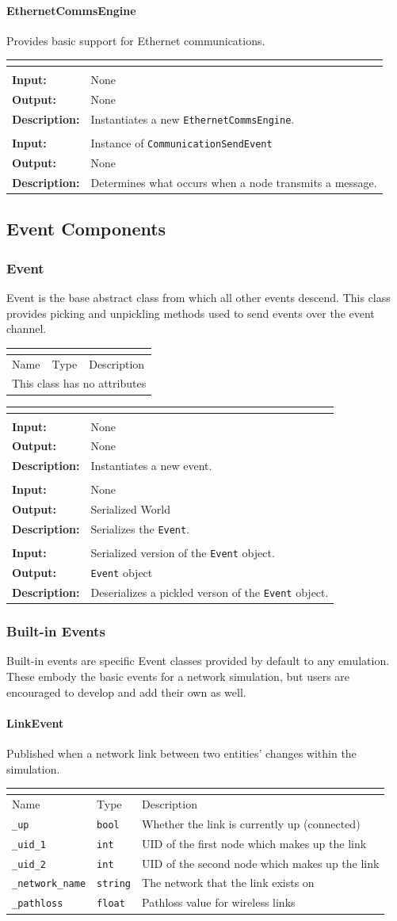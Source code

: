 \documentclass[titlepage]{article}
\newcommand{\operations}[1]{
\begin{center}
    \begin{longtable}{|p{4cm}|p{10cm + 2.0\tabcolsep}|}
    \hline
    \multicolumn{2}{|l|}{\cellcolor[gray]{0.5}{\textbf{Operations}}} \\ \hline
#1
    \end{longtable}
\end{center}
}
\newcommand{\operation}[4]{
    \hline
    \multicolumn{2}{|l|}{\cellcolor[gray]{0.8}{\texttt{#1}}} \\ \hline
    \hspace{7pt}\textbf{Input:} & #2 \\ \hline
    \hspace{7pt}\textbf{Output:} & #3 \\ \hline
    \hspace{7pt}\textbf{Description:} & #4 \\ \hline
}
\newcommand{\noattributes}{
    \begin{center}
        \begin{tabular}{|p{3cm}|p{3cm}|p{8cm}|}
            \multicolumn{3}{|l|}{\cellcolor[gray]{0.5}{\textbf{Attributes}}} \\ \hline
            \rowcolor[gray]{0.8} Name & Type & Description \\ \hline 
            \multicolumn{3}{|c|}{This class has no attributes} \\ \hline
        \end{tabular}
    \end{center}
}
\newcommand{\attributes}[1]{
    \begin{center}
        \begin{tabular}{|p{3cm}|p{3cm}|p{8cm}|}
            \multicolumn{3}{|l|}{\cellcolor[gray]{0.5}{\textbf{Attributes}}} \\ \hline
            \rowcolor[gray]{0.8} Name & Type & Description \\ \hline 
            #1
        \end{tabular}
    \end{center}
}
\newcommand{\attribute}[3]{
    \texttt{#1} & \texttt{#2} & #3 \\ \hline
}
\begin{document}
\paragraph{EthernetCommsEngine}{Provides basic support for Ethernet communications.}
\operations
{
    \operation{\_\_init\_\_()}{None}{None}{Instantiates a new \texttt{EthernetCommsEngine}.}
    \operation{\_on\_send(event)}{Instance of \texttt{CommunicationSendEvent}}{None}{Determines what occurs when a node transmits a message.}
}

\subsection{Event Components}
\subsubsection{Event}{Event is the base abstract class from which all other events descend.  This class provides picking and unpickling methods used to send events over the event channel.}

\noattributes

\operations
{
    \operation{\_\_init\_\_()}{None}{None}{Instantiates a new event.}
    \operation{pickle()}{None}{Serialized World}{Serializes the \texttt{Event}.}
    \operation{from\_pickle(pickled)}{Serialized version of the \texttt{Event} object.}{\texttt{Event} object}{Deserializes a pickled verson of the \texttt{Event} object.}
}

\subsubsection{Built-in Events}
Built-in events are specific Event classes provided by default to any emulation. These embody the basic events for a network simulation, but users are encouraged to develop and add their own as well.
\paragraph{LinkEvent}{Published when a network link between two entities' changes within the simulation.}

\attributes{
    \attribute{\_up}{bool}{Whether the link is currently up (connected)}
    \attribute{\_uid\_1}{int}{UID of the first node which makes up the link}
    \attribute{\_uid\_2}{int}{UID of the second node which makes up the link}
    \attribute{\_network\_name}{string}{The network that the link exists on}
    \attribute{\_pathloss}{float}{Pathloss value for wireless links}
}
\end{document}
